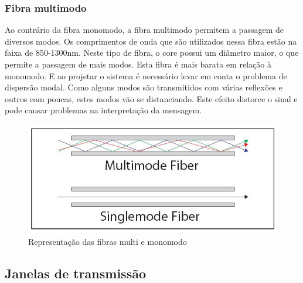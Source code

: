 \documentclass[article]{IEEEtran}
\begin{document}
\subsubsection{Fibra multimodo}
Ao contrário da fibra monomodo, a fibra multimodo permitem a passagem de diversos modos. Os comprimentos de onda que são utilizados nessa fibra estão na faixa de 850-1300nm. Neste tipo de fibra, o core possui um diâmetro maior, o que permite a passagem de mais modos. Esta fibra é mais barata em relação à monomodo. E ao projetar o sistema é necessário levar em conta o problema de dispersão modal. Como alguns modos são transmitidos com várias reflexões e outros com poucas, estes modos vão se distanciando. Este efeito distorce o sinal e pode causar problemas na interpretação da mensagem.

\begin{figure}[h]
\includegraphics[width=\columnwidth]{mono-multi.jpg}
\caption{Representação das fibras multi e monomodo}
\end{figure}


\subsection{Janelas de transmissão}
\end{document}
